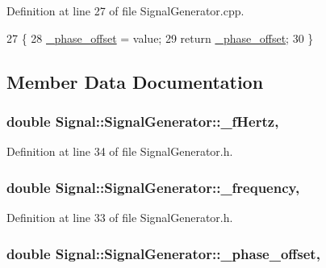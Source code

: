 Definition at line 27 of file Signal\+Generator.\+cpp.


\begin{DoxyCode}
27                                                                    \{
28     \hyperlink{classSignal_1_1SignalGenerator_a6b4444d46747c8517171edbbf4b5588f}{\_phase\_offset} = value;
29     \textcolor{keywordflow}{return} \hyperlink{classSignal_1_1SignalGenerator_a6b4444d46747c8517171edbbf4b5588f}{\_phase\_offset};
30 \}
\end{DoxyCode}


\subsection{Member Data Documentation}
\hypertarget{classSignal_1_1SignalGenerator_a85a4702347352bab1c71e0a8df8437d6}{
\subsubsection[{\+\_\+f\+Hertz}]{\setlength{\rightskip}{0pt plus 5cm}double Signal\+::\+Signal\+Generator\+::\+\_\+f\+Hertz\hspace{0.3cm}{\ttfamily [protected]}, {\ttfamily [inherited]}}}\label{classSignal_1_1SignalGenerator_a85a4702347352bab1c71e0a8df8437d6}


Definition at line 34 of file Signal\+Generator.\+h.

\hypertarget{classSignal_1_1SignalGenerator_a7f107461333bce68c5dad412db96a8c2}{
\subsubsection[{\+\_\+frequency}]{\setlength{\rightskip}{0pt plus 5cm}double Signal\+::\+Signal\+Generator\+::\+\_\+frequency\hspace{0.3cm}{\ttfamily [protected]}, {\ttfamily [inherited]}}}\label{classSignal_1_1SignalGenerator_a7f107461333bce68c5dad412db96a8c2}


Definition at line 33 of file Signal\+Generator.\+h.

\hypertarget{classSignal_1_1SignalGenerator_a6b4444d46747c8517171edbbf4b5588f}{
\subsubsection[{\+\_\+phase\+\_\+offset}]{\setlength{\rightskip}{0pt plus 5cm}double Signal\+::\+Signal\+Generator\+::\+\_\+phase\+\_\+offset\hspace{0.3cm}{\ttfamily [protected]}, {\ttfamily [inherited]}}}\label{classSignal_1_1SignalGenerator_a6b4444d46747c8517171edbbf4b5588f}


